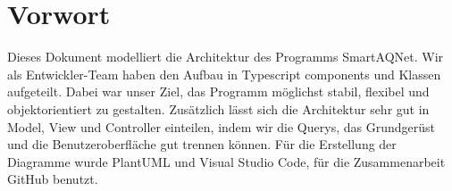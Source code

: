 \section{Vorwort}
Dieses Dokument modelliert die Architektur des Programms SmartAQNet. Wir als Entwickler-Team haben den Aufbau in Typescript components und Klassen aufgeteilt. Dabei war unser Ziel, das Programm möglichst stabil, flexibel und objektorientiert zu gestalten. Zusätzlich lässt sich die Architektur sehr gut in Model, View und Controller einteilen, indem wir die Querys, das Grundgerüst und die Benutzeroberfläche gut trennen können. Für die Erstellung der Diagramme wurde PlantUML und Visual Studio Code, für die Zusammenarbeit GitHub benutzt.

